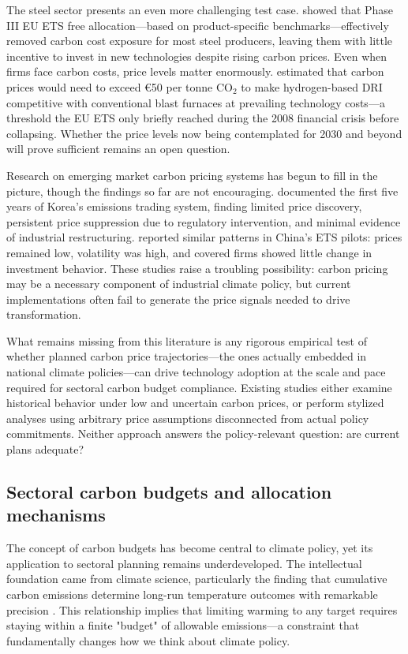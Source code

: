 \documentclass[preprint,1p,authoryear]{elsarticle}
\begin{document}
The steel sector presents an even more challenging test case. \citet{sartor2012benchmark} showed that Phase III EU ETS free allocation—based on product-specific benchmarks—effectively removed carbon cost exposure for most steel producers, leaving them with little incentive to invest in new technologies despite rising carbon prices. Even when firms face carbon costs, price levels matter enormously. \citet{demailly2018european} estimated that carbon prices would need to exceed €50 per tonne CO$_2$ to make hydrogen-based DRI competitive with conventional blast furnaces at prevailing technology costs—a threshold the EU ETS only briefly reached during the 2008 financial crisis before collapsing. Whether the price levels now being contemplated for 2030 and beyond will prove sufficient remains an open question.

Research on emerging market carbon pricing systems has begun to fill in the picture, though the findings so far are not encouraging. \citet{kim2021kets} documented the first five years of Korea's emissions trading system, finding limited price discovery, persistent price suppression due to regulatory intervention, and minimal evidence of industrial restructuring. \citet{wang2021carbon} reported similar patterns in China's ETS pilots: prices remained low, volatility was high, and covered firms showed little change in investment behavior. These studies raise a troubling possibility: carbon pricing may be a necessary component of industrial climate policy, but current implementations often fail to generate the price signals needed to drive transformation.

What remains missing from this literature is any rigorous empirical test of whether planned carbon price trajectories—the ones actually embedded in national climate policies—can drive technology adoption at the scale and pace required for sectoral carbon budget compliance. Existing studies either examine historical behavior under low and uncertain carbon prices, or perform stylized analyses using arbitrary price assumptions disconnected from actual policy commitments. Neither approach answers the policy-relevant question: are current plans adequate?

\subsection{Sectoral carbon budgets and allocation mechanisms}

The concept of carbon budgets has become central to climate policy, yet its application to sectoral planning remains underdeveloped. The intellectual foundation came from climate science, particularly the finding that cumulative carbon emissions determine long-run temperature outcomes with remarkable precision \citep{matthews2009proportionality}. This relationship implies that limiting warming to any target requires staying within a finite "budget" of allowable emissions—a constraint that fundamentally changes how we think about climate policy.
\end{document}
